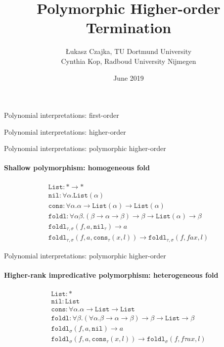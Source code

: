 \documentclass[10pt,presentation,color=names]{beamer}
\title{Polymorphic Higher-order Termination}
\author{\L{}ukasz Czajka, TU Dortmund University\\Cynthia Kop, Radboud University Nijmegen}
\date{June 2019}
\newcommand{\arrtype}{\rightarrow}
\newcommand{\red}{\longrightarrow}
\newcommand{\List}{\mathtt{List}}
\newcommand{\nil}{\mathtt{nil}}
\newcommand{\cons}{\mathtt{cons}}
\begin{document}
\maketitle

\begin{frame}{Polynomial interpretations: first-order}

\end{frame}

\begin{frame}{Polynomial interpretations: higher-order}

\end{frame}

\begin{frame}{Polynomial interpretations: polymorphic higher-order}
  \framesubtitle{Shallow polymorphism: homogeneous fold}
  \[
  \begin{array}{l}
    \List : * \to * \\
    \mathtt{nil} : \forall \alpha . \List(\alpha) \\
    \mathtt{cons} : \forall \alpha . \alpha \arrtype \List(\alpha) \arrtype \List(\alpha) \quad\quad \\
    \mathtt{foldl} : \forall \alpha \beta . (\beta \arrtype \alpha \arrtype \beta) \arrtype \beta \arrtype \List(\alpha) \arrtype \beta \\
    \mathtt{foldl}_{\tau,\sigma}(f,a,\nil_\tau) \red a \\
    \mathtt{foldl}_{\tau,\sigma}(f,a,\cons_\tau(x,l)) \red \mathtt{foldl}_{\tau,\sigma}(f,f a x,l)
  \end{array}
  \]
\end{frame}

\begin{frame}{Polynomial interpretations: polymorphic higher-order}
  \framesubtitle{Higher-rank impredicative polymorphism: heterogeneous fold}
  \[
  \begin{array}{l}
    \List : * \\
    \mathtt{nil} : \List \\
    \mathtt{cons} : \forall \alpha . \alpha \arrtype \List \arrtype \List \quad\quad \\
    \mathtt{foldl} : \forall \beta . (\forall \alpha . \beta \arrtype \alpha \arrtype \beta) \arrtype \beta \arrtype \List \arrtype \beta \\
    \mathtt{foldl}_\sigma(f,a,\nil) \red a \\
    \mathtt{foldl}_\sigma(f,a,\cons_\tau(x,l)) \red \mathtt{foldl}_\sigma(f,f \tau a x,l)
  \end{array}
  \]
\end{frame}
\end{document}

